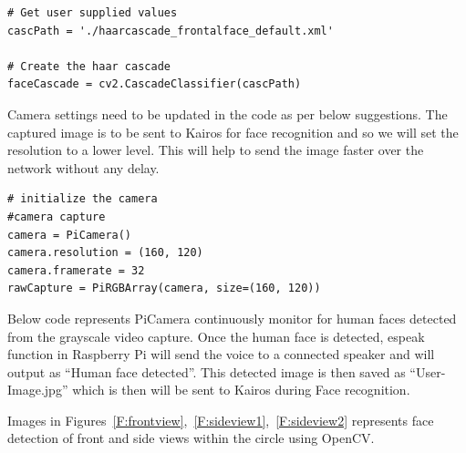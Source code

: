 \begin{verbatim}
# Get user supplied values
cascPath = './haarcascade_frontalface_default.xml'

# Create the haar cascade
faceCascade = cv2.CascadeClassifier(cascPath)
\end{verbatim}


Camera settings need to be updated in the code as per below suggestions. 
The captured image is to be sent to Kairos for face recognition and so we 
will set the resolution to a lower level. This will help to send the image 
faster over the network without any delay.


\begin{verbatim}
# initialize the camera 
#camera capture
camera = PiCamera()
camera.resolution = (160, 120)
camera.framerate = 32
rawCapture = PiRGBArray(camera, size=(160, 120))
\end{verbatim}


Below code represents PiCamera continuously monitor for human faces detected 
from the grayscale video capture. Once the human face is detected, espeak 
function in Raspberry Pi will send the voice to a connected speaker and will 
output as ``Human face detected''. This detected image is then saved as 
``User-Image.jpg'' which is then will be sent to Kairos during Face 
recognition.

Images in Figures~\ref{F:frontview},~\ref{F:sideview1},~\ref{F:sideview2} 
represents face detection of front and side views within the circle using 
OpenCV.



